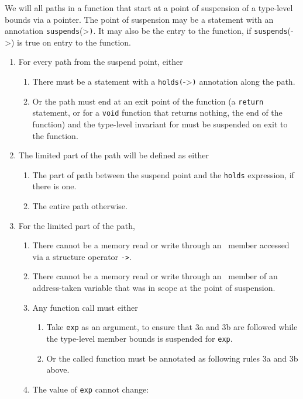 We will all paths in a function that start at a point of suspension of a
type-level bounds via a pointer. The point of suspension may be a
statement with an annotation
\texttt{suspends}(\textgreater{}\texttt{)}.
It may also be the entry to the function, if
\texttt{suspends}(-\textgreater{}) is true on
entry to the function.

\begin{enumerate}
\item
  For every path from the suspend point, either

  \begin{enumerate}
  \item
    There must be a statement with a
    \texttt{holds(}-\textgreater{}\texttt{)}
    annotation along the path.
  \item
    Or the path must end at an exit point of the function (a
    \texttt{return} statement, or for a \texttt{void} function that
    returns nothing, the end of the function) and the type-level
    invariant for  must be suspended on exit to the function.
  \end{enumerate}
\item
  The limited part of the path will be defined as either

  \begin{enumerate}
  \item
    The part of path between the suspend point and the \texttt{holds}
    expression, if there is one.
  \item
    The entire path otherwise.
  \end{enumerate}
\item
  For the limited part of the path,

  \begin{enumerate}
  \item
    There cannot be a memory read or write through an
    \arrayptr\ member accessed via a structure operator
    \texttt{-\textgreater{}}.
  \item
    There cannot be a memory read or write through an
    \arrayptr\ member of an address-taken variable that was in
    scope at the point of suspension.
  \item
    Any function call must either

    \begin{enumerate}
    \item
      Take \texttt{exp} as an argument, to ensure that 3a and 3b are
      followed while the type-level member bounds is suspended for
      \texttt{exp}.
    \item
      Or the called function must be annotated as following rules 3a and
      3b above.
    \end{enumerate}
  \item
    The value of \texttt{exp} cannot change:


\end{enumerate}
\end{enumerate}
